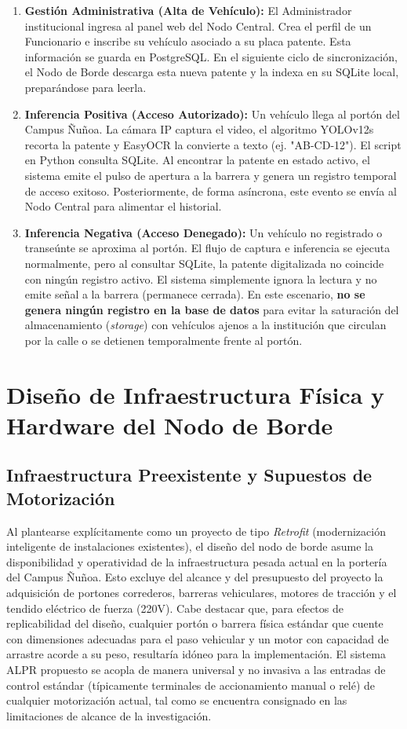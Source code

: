 \begin{enumerate}
    \item \textbf{Gestión Administrativa (Alta de Vehículo):} El Administrador institucional ingresa al panel web del Nodo Central. Crea el perfil de un Funcionario e inscribe su vehículo asociado a su placa patente. Esta información se guarda en PostgreSQL. En el siguiente ciclo de sincronización, el Nodo de Borde descarga esta nueva patente y la indexa en su SQLite local, preparándose para leerla.
    \item \textbf{Inferencia Positiva (Acceso Autorizado):} Un vehículo llega al portón del Campus Ñuñoa. La cámara IP captura el video, el algoritmo YOLOv12s recorta la patente y EasyOCR la convierte a texto (ej. "AB-CD-12"). El script en Python consulta SQLite. Al encontrar la patente en estado activo, el sistema emite el pulso de apertura a la barrera y genera un registro temporal de acceso exitoso. Posteriormente, de forma asíncrona, este evento se envía al Nodo Central para alimentar el historial.
    \item \textbf{Inferencia Negativa (Acceso Denegado):} Un vehículo no registrado o transeúnte se aproxima al portón. El flujo de captura e inferencia se ejecuta normalmente, pero al consultar SQLite, la patente digitalizada no coincide con ningún registro activo. El sistema simplemente ignora la lectura y no emite señal a la barrera (permanece cerrada). En este escenario, \textbf{no se genera ningún registro en la base de datos} para evitar la saturación del almacenamiento (\textit{storage}) con vehículos ajenos a la institución que circulan por la calle o se detienen temporalmente frente al portón.
\end{enumerate}

\section{Diseño de Infraestructura Física y Hardware del Nodo de Borde}

\subsection{Infraestructura Preexistente y Supuestos de Motorización}

Al plantearse explícitamente como un proyecto de tipo \textit{Retrofit} (modernización inteligente de instalaciones existentes), el diseño del nodo de borde asume la disponibilidad y operatividad de la infraestructura pesada actual en la portería del Campus Ñuñoa. Esto excluye del alcance y del presupuesto del proyecto la adquisición de portones correderos, barreras vehiculares, motores de tracción y el tendido eléctrico de fuerza (220V). Cabe destacar que, para efectos de replicabilidad del diseño, cualquier portón o barrera física estándar que cuente con dimensiones adecuadas para el paso vehicular y un motor con capacidad de arrastre acorde a su peso, resultaría idóneo para la implementación. El sistema ALPR propuesto se acopla de manera universal y no invasiva a las entradas de control estándar (típicamente terminales de accionamiento manual o relé) de cualquier motorización actual, tal como se encuentra consignado en las limitaciones de alcance de la investigación.

